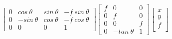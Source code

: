 \documentclass[12pt]{article}
\begin{document}
\begin{equation}
\begin{split}
\begin{bmatrix}
0 & cos~\theta & sin~\theta  & -f~sin~\theta \\
0 & -sin~\theta & cos~\theta&-f~cos~\theta\\
0 & 0 & 0 & 1
\end{bmatrix} \begin{bmatrix}
f & 0 & 0\\
0 & f & 0 \\
0 & 0 & f\\
0 & -tan~\theta & 1 
\end{bmatrix} \begin{bmatrix}
x\\
y\\
f\\
\end{bmatrix}
\end{split}
\label{eqn:sch2o}
\end{equation}
\end{document}
